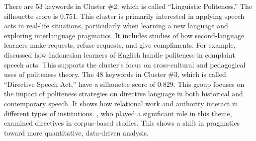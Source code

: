 \documentclass[english]{textolivre}
\begin{document}
There are 53 keywords in Cluster \#2, which is called ``Linguistic Politeness.'' The silhouette score is 0.751. This cluster is primarily interested in applying speech acts in real-life situations, particularly when learning a new language and exploring interlanguage pragmatics. It includes studies of how second-language learners make requests, refuse requests, and give compliments. For example, \textcite{wijayanto2013} discussed how Indonesian learners of English handle politeness in complaint speech acts. This supports the cluster’s focus on cross-cultural and pedagogical uses of politeness theory. The 48 keywords in Cluster \#3, which is called ``Directive Speech Act,'' have a silhouette score of 0.829. This group focuses on the impact of politeness strategies on directive language in both historical and contemporary speech. It shows how relational work and authority interact in different types of institutions. \textcite{ronan2022}, who played a significant role in this theme, examined directives in corpus-based studies. This shows a shift in pragmatics toward more quantitative, data-driven analysis.
\end{document}
